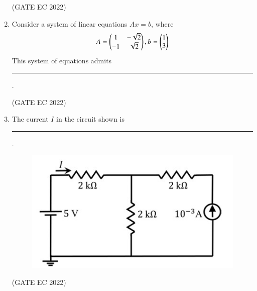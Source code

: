 \documentclass[journal,12pt,onecolumn]{IEEEtran}
\theoremstyle{remark}
\begin{document}
\begin{enumerate}
    \hfill{(GATE EC 2022)}
    \begin{enumerate}
    \end{enumerate}

    \item Consider a system of linear equations $Ax = b$, where
    \begin{align*}
        A = \begin{pmatrix}1 & -\sqrt{2} \\ -1 & \sqrt{2}\end{pmatrix},  b = \begin{pmatrix}1 \\ 3\end{pmatrix}
    \end{align*}
    This system of equations admits \rule{2cm}{0.4pt}.

    \hfill{(GATE EC 2022)}
    \begin{enumerate}
    \end{enumerate}

    \item The current $I$ in the circuit shown is \rule{2cm}{0.4pt}.
    \begin{figure}[H]
        \centering
        \includegraphics[width=0.5\columnwidth]{figs/m5.jpg}
        \caption*{}
        \label{fig:m5}
    \end{figure}

    \hfill{(GATE EC 2022)}
    \begin{enumerate}
    \end{enumerate}


\end{enumerate}
\end{document}
